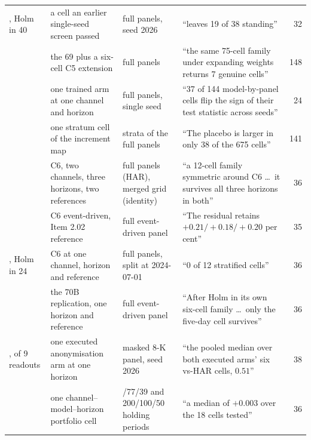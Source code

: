 \begin{table}[p]
\begin{tabular}{@{}>{\raggedright\arraybackslash}p{}>{\raggedright\arraybackslash}p{}>{\raggedright\arraybackslash}p{}>{\raggedright\arraybackslash}p{}r@{}}
38, Holm in 40 & a cell an earlier single-seed screen passed & full panels, seed 2026 & ``leaves 19 of 38 standing'' & 32 \\ %
75 & the 69 plus a six-cell C5 extension & full panels & ``the same 75-cell family under expanding weights returns 7 genuine cells'' & 148 \\ %
144 & one trained arm at one channel and horizon & full panels, single seed & ``37 of 144 model-by-panel cells flip the sign of their test statistic across seeds'' & 24 \\ %
675 & one stratum cell of the increment map & strata of the full panels & ``The placebo is larger in only 38 of the 675 cells'' & 141 \\ %
\addlinespace
12 & C6, two channels, three horizons, two references & full panels (HAR), merged grid (identity) & ``a 12-cell family symmetric around C6 \dots\ it survives all three horizons in both'' & 36 \\ %
3 & C6 event-driven, Item 2.02 reference & full event-driven panel & ``The residual retains $+0.21/+0.18/+0.20$ per cent'' & 35 \\ %
12, Holm in 24 & C6 at one channel, horizon and reference & full panels, split at 2024-07-01 & ``0 of 12 stratified cells'' & 36 \\ %
6 & the 70B replication, one horizon and reference & full event-driven panel & ``After Holm in its own six-cell family \dots\ only the five-day cell survives'' & 36 \\ %
6, of 9 readouts & one executed anonymisation arm at one horizon & masked 8-K panel, seed 2026 & ``the pooled median over both executed arms' six vs-HAR cells, $0.51$'' & 38 \\ %
\addlinespace
18 & one channel--model--horizon portfolio cell & 159/77/39 and 200/100/50 holding periods & ``a median of $+0.003$ over the 18 cells tested'' & 36 \\ %

\end{tabular}
\end{table}
